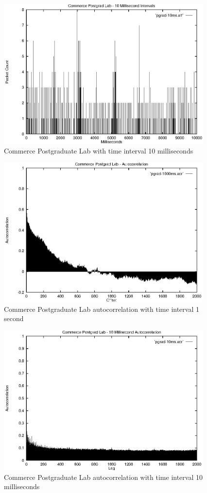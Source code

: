\begin{figure}
\includegraphics[height=3in]{pics/pgrad-10ms-freq.eps}
\caption{Commerce Postgraduate Lab with time interval 10 milliseconds}
\label{results:pgrad.10ms.freq}
\end{figure}

\begin{figure}
\includegraphics[height=3in]{pics/pgrad-1s-acr.eps}
\caption{Commerce Postgraduate Lab autocorrelation with time interval 1 second}
\label{results:pgrad.1s.acr}
\end{figure}

\begin{figure}
\includegraphics[height=3in]{pics/pgrad-10ms-acr.eps}
\caption{Commerce Postgraduate Lab autocorrelation with time interval 10 milliseconds}
\label{results:pgrad.10ms.acr}
\end{figure}

